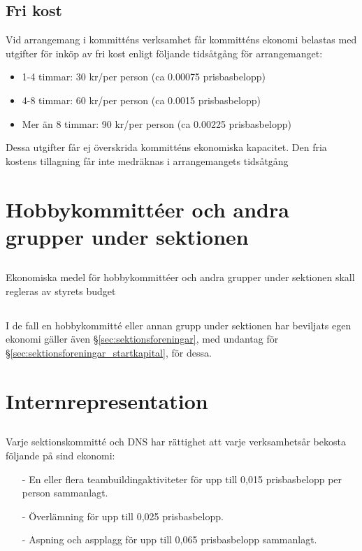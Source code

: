 \documentclass[a4paper, 10pt]{article}
\begin{document}
\subsection{Fri kost}
Vid arrangemang i kommitténs verksamhet får kommitténs ekonomi belastas med utgifter för inköp av fri kost enligt följande tidsåtgång för arrangemanget:
\begin{itemize}
    \item 1-4 timmar: 30 kr/per person (ca 0.00075 prisbasbelopp)
    \item 4-8 timmar: 60 kr/per person (ca 0.0015 prisbasbelopp)
    \item Mer än 8 timmar: 90 kr/per person (ca 0.00225 prisbasbelopp)
\end{itemize}
Dessa utgifter får ej överskrida kommitténs ekonomiska kapacitet. Den fria kostens tillagning får inte medräknas i arrangemangets tidsåtgång

\section{Hobbykommittéer och andra grupper under sektionen}
\subsection{}
Ekonomiska medel för hobbykommittéer och andra grupper under sektionen skall regleras av styrets budget
\subsection{}
I de fall en hobbykommitté eller annan grupp under sektionen har beviljats egen ekonomi gäller även \S\ref{sec:sektionsforeningar}, med undantag för \S\ref{sec:sektionsforeningar_startkapital}, för dessa.

\section{Internrepresentation}
\subsection{}
\label{sec:internreps}
Varje sektionskommitté och DNS har rättighet att varje verksamhetsår bekosta följande på sind ekonomi:
\begin{itemize}
    \item[-] En eller flera teambuildingaktiviteter för upp till 0,015 prisbasbelopp per person sammanlagt.
    \item[-] Överlämning för upp till 0,025 prisbasbelopp.
    \item[-] Aspning och aspplagg för upp till 0,065 prisbasbelopp sammanlagt.
\end{itemize}
\end{document}
